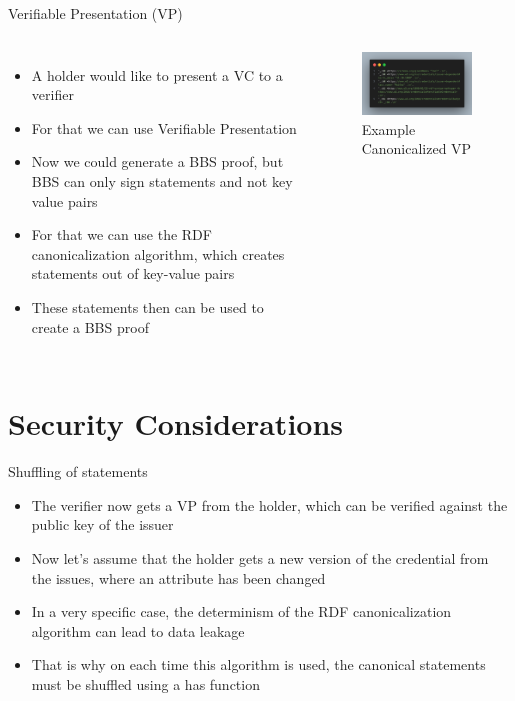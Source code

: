 \documentclass[
	english,%
	authorontitle=true,
	]{bfhbeamer}
\begin{document}
\begin{frame}{Verifiable Presentation (VP)}
    \begin{columns}[onlytextwidth,T]
        \column{70mm}  
        \begin{itemize}
            \item A holder would like to present a VC to a verifier
            \item For that we can use Verifiable Presentation
            \item Now we could generate a BBS proof, but BBS can only sign statements and not key value pairs
            \item For that we can use the RDF canonicalization algorithm, which creates statements out of key-value pairs
            \item These statements then can be used to create a BBS proof
        \end{itemize}

        \column{70mm}

        \begin{figure}
            \centering
            \includegraphics[width=70mm]{./img/VPcanon.png}
            \caption{Example Canonicalized VP}
        \end{figure}

    \end{columns}
\end{frame}

\section{Security Considerations}

\begin{frame}{Shuffling of statements}
    \begin{itemize}
        \item The verifier now gets a VP from the holder, which can be verified against the public key of the issuer
        \item Now let's assume that the holder gets a new version of the credential from the issues, where an attribute has been changed
        \item In a very specific case, the determinism of the RDF canonicalization algorithm can lead to data leakage
        \item That is why on each time this algorithm is used, the canonical statements must be shuffled using a has function
    \end{itemize}
\end{frame}
\end{document}
